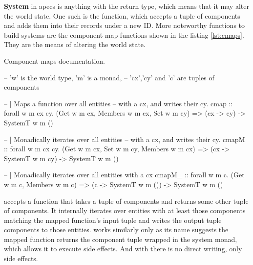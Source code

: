 \documentclass[
  digital, %
  color,   %
  table,   %
  oneside, %
  lof,     %
  lot,     %
]{fithesis3}
\begin{document}
\textbf{System} in apecs is anything with the  return type, which
means that it may alter the world state.
One such  is the  function, which
accepts a tuple of components and adds them into their records under a new ID.
More noteworthy functions to build systems are the component map functions
shown in the listing \ref{lst:cmaps}. They are the means of altering the world state.
\begin{listing}[H]
\caption{Component maps documentation.\cite{apecsdocs}}
\begin{haskell}
-- 'w' is the world type, 'm' is a monad,
-- 'cx','cy' and 'c' are tuples of components

-- | Maps a function over all entities
--   with a cx, and writes their cy.
cmap :: forall w m cx cy.
    (Get w m cx, Members w m cx, Set w m cy) =>
    (cx -> cy) -> SystemT w m ()

-- | Monadically iterates over all entities
--   with a cx, and writes their cy.
cmapM :: forall w m cx cy.
    (Get w m cx, Set w m cy, Members w m cx) =>
    (cx -> SystemT w m cy) -> SystemT w m ()

-- | Monadically iterates over all entities with a cx
cmapM_ :: forall w m c.
    (Get w m c, Members w m c) =>
    (c -> SystemT w m ()) -> SystemT w m ()
\end{haskell}
\label{lst:cmaps}
\end{listing}
 accepts a function that takes a tuple of components
and returns some other tuple of components. It internally iterates
over entities with at least those components matching the mapped
function's input tuple and writes the output tuple components
to those entities.  works similarly
only as its name suggests the mapped function returns the component
tuple wrapped in the system monad, which allows it to execute side effects.
And with  there is no direct writing, only side effects.
\end{document}
